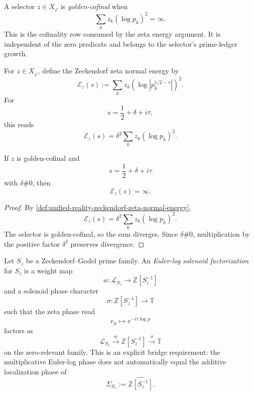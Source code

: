 \begin{definition}
\label{def:unified-reality-golden-cofinal-selector}
A selector $z\in X_{\varphi}$ is \emph{golden-cofinal} when
$$
\sum_k z_k(\log p_k)^2=\infty.
$$
This is the cofinality row consumed by the zeta energy argument.  It is
independent of the zero predicate and belongs to the selector's
prime-ledger growth.
\end{definition}

\begin{definition}
\label{def:unified-reality-zeckendorf-zeta-normal-energy}
For $z\in X_{\varphi}$, define the Zeckendorf zeta normal energy by
$$
\mathcal E_z(s)
:=
\sum_k z_k
\left(
\log |p_k^{1/2-s}|
\right)^2.
$$
For
$$
s=\frac12+\delta+i\tau,
$$
this reads
$$
\mathcal E_z(s)
=
\delta^2\sum_k z_k(\log p_k)^2.
$$
\end{definition}

\begin{theorem}
\label{thm:unified-reality-golden-cofinal-selectors-detect-off-half-energy}
If $z$ is golden-cofinal and
$$
s=\frac12+\delta+i\tau
$$
with $\delta\#0$, then
$$
\mathcal E_z(s)=\infty.
$$
\end{theorem}

\begin{proof}
By
\autoref{def:unified-reality-zeckendorf-zeta-normal-energy},
$$
\mathcal E_z(s)
=
\delta^2\sum_k z_k(\log p_k)^2.
$$
The selector is golden-cofinal, so the sum diverges.  Since
$\delta\#0$, multiplication by the positive factor $\delta^2$ preserves
divergence.
\end{proof}

\begin{definition}
\label{def:unified-reality-euler-log-solenoid-factorization}
Let $S_z$ be a Zeckendorf--Godel prime family.  An
\emph{Euler-log solenoid factorization} for $S_z$ is a weight map
$$
w:\mathcal L_{S_z}\to\mathbb Z[S_z^{-1}]
$$
and a solenoid phase character
$$
\sigma:\mathbb Z[S_z^{-1}]\to\mathbb T
$$
such that the zeta phase read
$$
e_p\mapsto e^{-i\tau\log p}
$$
factors as
$$
\mathcal L_{S_z}
\xrightarrow{w}
\mathbb Z[S_z^{-1}]
\xrightarrow{\sigma}
\mathbb T
$$
on the zero-relevant family.  This is an explicit bridge requirement:
the multiplicative Euler-log phase does not automatically equal the
additive localization phase of
$$
\Sigma_{S_z}:=\widehat{\mathbb Z[S_z^{-1}]}.
$$
\end{definition}

